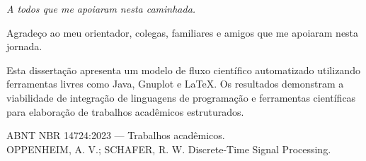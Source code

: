 \documentclass[12pt,openright,oneside,a4paper]{abntex2}
\begin{document}
\imprimircapa
\imprimirfolhaderosto

\begin{folhadeaprovacao}
\end{folhadeaprovacao}

\begin{dedicatoria}
\vspace*{\fill}
\centering
{\normalfont \em A todos que me apoiaram nesta caminhada.}
\vspace*{\fill}
\end{dedicatoria}

\begin{agradecimentos}
Agradeço ao meu orientador, colegas, familiares e amigos que me apoiaram nesta jornada.
\end{agradecimentos}

\begin{resumo}
Esta dissertação apresenta um modelo de fluxo científico automatizado utilizando ferramentas livres como Java, Gnuplot e \LaTeX. Os resultados demonstram a viabilidade de integração de linguagens de programação e ferramentas científicas para elaboração de trabalhos acadêmicos estruturados.
\end{resumo}

\begin{abstract}
This dissertation presents a model of automated scientific workflow using free tools such as Java, Gnuplot, and \LaTeX. The results demonstrate the feasibility of integrating programming languages and scientific tools for the preparation of structured academic works.
\end{abstract}

\tableofcontents
\listoffigures
\cleardoublepage







\begin{references}
\noindent
[1] ABNT NBR 14724:2023 — Trabalhos acadêmicos.\\
[2] OPPENHEIM, A. V.; SCHAFER, R. W. Discrete-Time Signal Processing.
\end{references}
\end{document}
